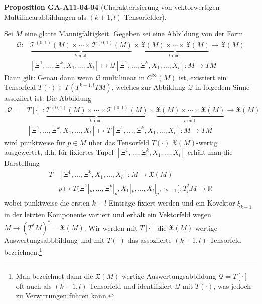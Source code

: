 \documentclass[10pt, letterpaper]{article}
\newcommand{\R}{\mathbb{R}}
\newcommand{\CustomHeading}[3]{%
  \par\medskip\noindent%
  \textbf{#1 #2} \textnormal{(#3)}.\enskip%
}
\newenvironment{PROP}[2]{\begin{unitbox}\CustomHeading{Proposition}{#1}{#2}}{\end{unitbox}}
\begin{document}
\begin{PROP}{GA-A11-04-04}{Charakterisierung von vektorwertigen Multilinearabbildungen als $(k+1,l)$-Tensorfelder}
Sei $M$ eine glatte Mannigfaltigkeit. Gegeben sei eine Abbildung von der Form
\begin{align*}
    \mathcal{Q}: & \underbrace{\mathcal{T}^{(0,1)}(M) \times \cdots \times \mathcal{T}^{(0,1)}(M)}_{k \text { mal }} \times \underbrace{\mathfrak{X}(M) \times \cdots \times \mathfrak{X}(M)}_{l \text { mal }} \rightarrow \mathfrak{X}(M)\\  
    &[\Xi^1,…,\Xi^k,X_1,…,X_l] \mapsto \mathcal{Q}[\Xi^1,…,\Xi^k,X_1,…,X_l]:M\to TM
\end{align*}
Dann gilt: Genau dann wenn $\mathcal{Q}$ multilinear in $C^\infty(M)$ ist, existiert ein Tensorfeld $T(\cdot)\in \Gamma(T^{k+1,l}TM)$, welches zur Abbildung $\mathcal{Q}$ in folgedem Sinne assoziiert ist: Die Abbildung
\begin{align*}
    \mathcal{Q}=&T[\cdot]: \underbrace{\mathcal{T}^{(0,1)}(M) \times \cdots \times \mathcal{T}^{(0,1)}(M)}_{k \text { mal }} \times \underbrace{\mathfrak{X}(M) \times \cdots \times \mathfrak{X}(M)}_{l \text { mal }} \rightarrow \mathfrak{X}(M)\\  
    &[\Xi^1,…,\Xi^k,X_1,…,X_l] \mapsto T[\Xi^1,…,\Xi^k,X_1,…,X_l]:M\to TM
\end{align*}
wird punktweise für $p\in M$ über das Tensorfeld $T(\cdot)$ $\mathfrak{X}(M)$-wertig ausgewertet, d.h. für fixiertes Tupel $[\Xi^1,…,\Xi^k,X_1,…,X_l]$ erhält man die Darstellung
\begin{align*}
    T&[\Xi^1,…,\Xi^k,X_1,…,X_l]: M \to \mathfrak{X}(M)\\  
    &p\mapsto T(\Xi^1|_p,…,\Xi^k|_p,X_1|_p,…,X_l|_p,\cdot_{k+1}]:T_p^*M\to\R
\end{align*}
wobei punktweise die ersten $k+l$ Einträge fixiert werden und ein Kovektor $\xi_{k+1}$ in der letzten Komponente variiert und erhält ein Vektorfeld wegen $M\to(T^*M)^*=\mathfrak{X}(M)$. Wir werden mit $T[\cdot]$ die $\mathfrak{X}(M)$-wertige Auswertungsabbbildung und mit $T(\cdot)$ das assoziierte $(k+1,l)$-Tensorfeld bezeichnen.\footnote{Man bezeichnet dann die $\mathfrak{X}(M)$-wertige Auswertungsabbildung $\mathcal{Q}=T[\cdot]$ oft auch als $(k+1,l)$-Tensorfeld und identifiziert $\mathcal{Q}$ mit $T(\cdot)$, was jedoch zu Verwirrungen führen kann.}
\end{PROP}
\end{document}
